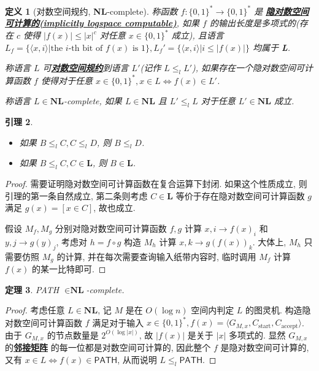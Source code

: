 \documentclass[8pt]{article}
\theoremstyle{compact}
\newtheorem{theorem}{定理}[section]
\newtheorem{lemma}[theorem]{引理}
\newtheorem{definition}[theorem]{定义}
\def\obj#1{\textbf{\uline{#1}}}
\def\le{\leqslant}
\def\L{\textbf{L}}
\def\NL{\textbf{NL}}
\begin{document}
\begin{definition}[对数空间规约, \NL-complete]
	称函数 $f: \{0, 1\}^* \to \{0, 1\}^*$ 是 \obj{隐对数空间可计算的(implicitly logspace computable)}, 如果 $f$ 的输出长度是多项式的(存在 $c$ 使得 $|f(x)| \le |x|^c$ 对任意 $x \in \{0, 1\}^*$ 成立), 且语言 $L_f = \{\langle x, i \rangle | \text{the } i \text{-th bit of } f(x) \text{ is } 1\}, L_f' = \{\langle x, i \rangle | i \le |f(x)|\}$ 均属于 \L.

	称语言 $L$ 可\obj{对数空间规约}到语言 $L'$(记作 $L \le_l L'$), 如果存在一个隐对数空间可计算函数 $f$ 使得对于任意 $x \in \{0, 1\}^*, x \in L \Leftrightarrow f(x) \in L'$.

	称语言 $L \in \NL$-complete, 如果 $L \in \NL$ 且 $L' \le_l L$ 对于任意 $L' \in \NL$ 成立.
	
	\label{def_logspace}
\end{definition}
\begin{lemma}
	\begin{itemize}
		\item 如果 $B \le_l C, C \le_l D$, 则 $B \le_l D$.
		\item 如果 $B \le_l C, C \in \L$, 则 $B \in \L$.
	\end{itemize}
\end{lemma}
\begin{proof}
	需要证明隐对数空间可计算函数在复合运算下封闭. 如果这个性质成立, 则引理的第一条自然成立, 第二条则考虑 $C \in \L$ 等价于存在隐对数空间可计算函数 $g$ 满足 $g(x) = [x \in C]$, 故也成立.

	假设 $M_f, M_g$ 分别对隐对数空间可计算函数 $f, g$ 计算 $x, i \to f(x)_i$ 和 $y, j \to g(y)_j$, 考虑对 $h = f \circ g$ 构造 $M_h$ 计算 $x, k \to g(f(x))_k$. 大体上, $M_h$ 只需要仿照 $M_g$ 的计算, 并在每次需要查询输入纸带内容时, 临时调用 $M_f$ 计算 $f(x)$ 的某一比特即可.

\end{proof}
\begin{theorem}
	\textsf{PATH} $\in \NL$-complete.
\end{theorem}
\begin{proof}
	考虑任意 $L \in \NL$, 记 $M$ 是在 $O(\log n)$ 空间内判定 $L$ 的图灵机. 构造隐对数空间可计算函数 $f$ 满足对于输入 $x \in \{0, 1\}^*, f(x) = \langle G_{M, x}, C_{\text{start}}, C_{\text{accept}} \rangle$. 由于 $G_{M, x}$ 的节点数量是 $2^{O(\log |x|)}$, 故 $|f(x)|$ 是关于 $|x|$ 多项式的. 显然 $G_{M, x}$ 的\obj{邻接矩阵} 的每一位都是对数空间可计算的, 因此整个 $f$ 是隐对数空间可计算的, 又有 $x \in L \Leftrightarrow f(x) \in \textsf{PATH}$, 从而说明 $L \le_l \textsf{PATH}$.
\end{proof}
\end{document}
